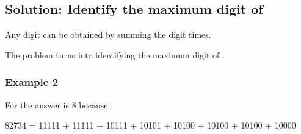 \documentclass[letterpaper,12pt,english]{book}
\begin{document}
\subsection{Solution: Identify the maximum digit of }
\label{\detokenize{Mathematics/09_MTH_1689_Partitioning_Into_Minimum_Number_Of_Deci-Binary_Numbers:solution-identify-the-maximum-digit-of-n}}
\sphinxAtStartPar
Any digit  can be obtained by summing the digit   times.

\sphinxAtStartPar
The problem turns into identifying the maximum digit of .


\subsubsection{Example 2}
\label{\detokenize{Mathematics/09_MTH_1689_Partitioning_Into_Minimum_Number_Of_Deci-Binary_Numbers:id1}}
\sphinxAtStartPar
For  the answer is 8 because:

\begin{sphinxVerbatim}[commandchars=\\\{\}]
  82734
= 11111 
+ 11111 
+ 10111 
+ 10101 
+ 10100
+ 10100
+ 10100
+ 10000
\end{sphinxVerbatim}
\end{document}
